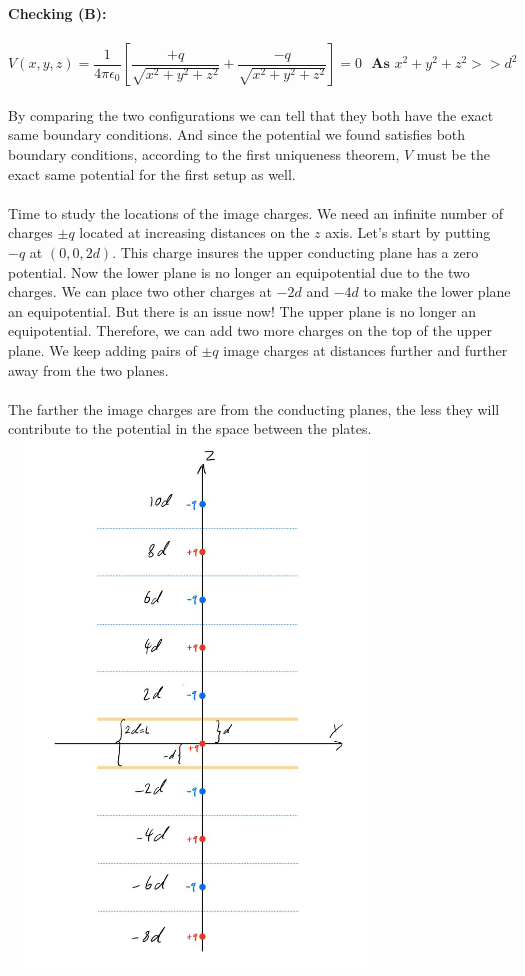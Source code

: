 \documentclass[fleqn]{article}
\begin{document}
\begin{enumerate}
{        \textbf{Checking (B):}
        \\
        \\
        $
          V(x, y, z)=\dfrac{1}{4 \pi \epsilon_0} \left[
            \dfrac{+q}{\sqrt{x^2+y^2+z^2}}
            +\dfrac{-q}{\sqrt{x^2+y^2+z^2}}
          \right]=0 ~~~ \textbf{As $x^2+y^2+z^2 >> d^2$}
        $
        \\
        \\
        By comparing the two configurations we can tell that they both have the exact same boundary conditions. And since 
        the potential we found satisfies both boundary conditions, according to the first uniqueness theorem, $V$ must be 
        the exact same potential for the first setup as well.
        \\
        \\
        Time to study the locations of the image charges. We need an infinite number of charges $\pm q$ located at increasing
        distances on the $z$ axis. Let's start by putting $-q$ at $(0, 0, 2d)$. This charge insures the upper conducting plane
        has a zero potential. Now the lower plane is no longer an equipotential due to the two charges. We can place two other 
        charges at $-2d$ and $-4d$ to make the lower plane an equipotential. But there is an issue now! The upper plane is no longer
        an equipotential. Therefore, we can add two more charges on the top of the upper plane. We keep adding pairs of 
        $\pm q$ image charges at distances further and further away from the two planes. 
        \\
        \\
        The farther the image charges are from the conducting planes, the less they will contribute to the potential in 
        the space between the plates.
        \\
        \includegraphics[height=14cm, width=10cm]{five.JPG}
        \\
      }


\end{enumerate}
\end{document}
